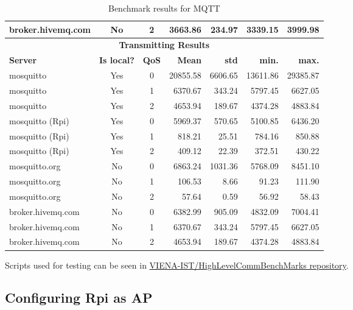 \begin{table}
\begin{tabular}{lccrrrr}
		broker.hivemq.com & No      &2    & 3663.86        &234.97  &3339.15 & 3999.98  \\
		\toprule
		\multicolumn{7}{c}{\textbf{Transmitting Results}}\\
		\textbf{Server} & \textbf{Is local?} & \textbf{QoS} & \textbf{Mean} & \textbf{std} & \textbf{min.} & \textbf{max.}\\
		\toprule
		mosquitto         & Yes     &0    & 20855.58          &6606.65 &13611.86  &29385.87  \\
		mosquitto         & Yes     &1    & 6370.67           &343.24  &5797.45   &6627.05   \\
		mosquitto         & Yes     &2    & 4653.94           &189.67  &4374.28   &4883.84   \\
		\midrule
		mosquitto (Rpi)   & Yes     &0    & 5969.37           &570.65  &5100.85   &6436.20   \\
		mosquitto (Rpi)   & Yes     &1    & 818.21            &25.51   &784.16    &850.88    \\
		mosquitto (Rpi)   & Yes     &2    & 409.12            &22.39   &372.51    &430.22    \\
		\midrule
		mosquitto.org     & No      &0    & 6863.24           &1031.36 &5768.09   &8451.10   \\
		mosquitto.org     & No      &1    & 106.53            & 8.66   &  91.23   & 111.90   \\
		mosquitto.org     & No      &2    & 57.64             & 0.59   &  56.92   & 58.43    \\
		\midrule
		broker.hivemq.com & No      &0    & 6382.99           &905.09  & 4832.09  & 7004.41  \\
		broker.hivemq.com & No      &1    & 6370.67           &343.24  & 5797.45  & 6627.05  \\
		broker.hivemq.com & No      &2    & 4653.94           &189.67  & 4374.28  & 4883.84  \\
		\bottomrule
	\end{tabular}
	\caption{Benchmark results for MQTT}
	\label{tab:mqtt_results}
\end{table}

Scripts used for testing can be seen in \href{https://github.com/VIENA-IST/HighLevelCommBenchMarks}{VIENA-IST/HighLevelCommBenchMarks repository}.

\subsection{Configuring Rpi as AP}

